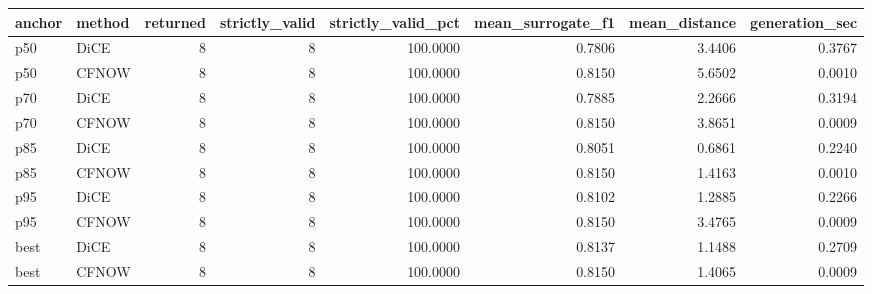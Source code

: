 \begin{tabular}{llrrrrrr}
\toprule
anchor & method &  returned &  strictly\_valid &  strictly\_valid\_pct &  mean\_surrogate\_f1 &  mean\_distance &  generation\_sec \\
\midrule
   p50 &   DiCE &         8 &               8 &            100.0000 &             0.7806 &         3.4406 &          0.3767 \\
   p50 &  CFNOW &         8 &               8 &            100.0000 &             0.8150 &         5.6502 &          0.0010 \\
   p70 &   DiCE &         8 &               8 &            100.0000 &             0.7885 &         2.2666 &          0.3194 \\
   p70 &  CFNOW &         8 &               8 &            100.0000 &             0.8150 &         3.8651 &          0.0009 \\
   p85 &   DiCE &         8 &               8 &            100.0000 &             0.8051 &         0.6861 &          0.2240 \\
   p85 &  CFNOW &         8 &               8 &            100.0000 &             0.8150 &         1.4163 &          0.0010 \\
   p95 &   DiCE &         8 &               8 &            100.0000 &             0.8102 &         1.2885 &          0.2266 \\
   p95 &  CFNOW &         8 &               8 &            100.0000 &             0.8150 &         3.4765 &          0.0009 \\
  best &   DiCE &         8 &               8 &            100.0000 &             0.8137 &         1.1488 &          0.2709 \\
  best &  CFNOW &         8 &               8 &            100.0000 &             0.8150 &         1.4065 &          0.0009 \\
\bottomrule
\end{tabular}
